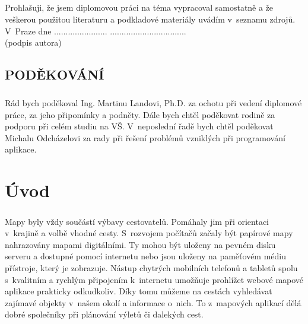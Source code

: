 \documentclass[11pt,a4paper,titlepage,oneside]{book}
\begin{document}
		\paragraph{}Prohlašuji, že jsem diplomovou práci na téma  vypracoval samostatně a že veškerou použitou literaturu a podkladové materiály uvádím v~seznamu zdrojů.\\[1cm]
	V~Praze dne ....................... ................................. \\
	 {(podpis autora)\hspace{0.25cm} }
	
\newpage %
	\vspace*{15cm}
	\section*{\Large PODĚKOVÁNÍ}
	\paragraph{} Rád bych poděkoval Ing. Martinu Landovi, Ph.D. za ochotu při vedení diplomové práce, za jeho připomínky a podněty. Dále bych chtěl poděkovat rodině za podporu při celém studiu na VŠ. V~neposlední řadě bych chtěl poděkovat Michalu Odcházelovi za rady při řešení problémů vzniklých při programování aplikace.
		
\renewcommand{\baselinestretch}{1.5} %
\newpage %
\pagestyle{plain}
\setcounter{page}{5}

	\tableofcontents

\newpage %
	\listoffigures

\newpage %
\chapter*{Úvod}

	\paragraph{} Mapy byly vždy součástí výbavy cestovatelů. Pomáhaly jim při orientaci v~krajině a volbě vhodné cesty. S~rozvojem počítačů začaly být papírové mapy nahrazovány mapami digitálními. Ty mohou být uloženy na pevném disku serveru a dostupné pomocí internetu nebo jsou uloženy na paměťovém médiu přístroje, který je zobrazuje. Nástup chytrých mobilních telefonů a tabletů spolu s~kvalitním a rychlým připojením k~internetu umožňuje prohlížet webové mapové aplikace prakticky odkudkoliv. Díky tomu můžeme na cestách vyhledávat zajímavé objekty v~našem okolí a informace o~nich. To z~mapových aplikací dělá dobré společníky při plánování výletů či dalekých cest.
\end{document}
